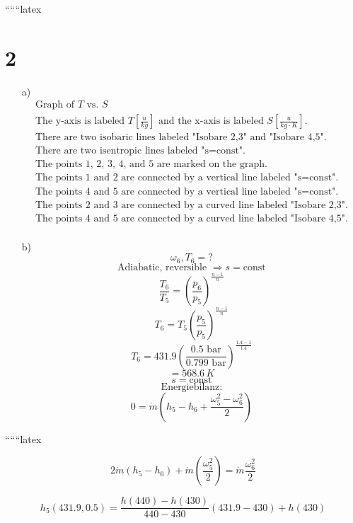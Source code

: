 
``````latex


\section*{2}
\begin{itemize}
    \item[a)] 
    \[
    \begin{array}{c}
    \text{Graph of } T \text{ vs. } S \\
    \text{The y-axis is labeled } T \left[ \frac{u}{kg} \right] \text{ and the x-axis is labeled } S \left[ \frac{u}{kg \cdot K} \right]. \\
    \text{There are two isobaric lines labeled "Isobare 2,3" and "Isobare 4,5".} \\
    \text{There are two isentropic lines labeled "s=const".} \\
    \text{The points 1, 2, 3, 4, and 5 are marked on the graph.} \\
    \text{The points 1 and 2 are connected by a vertical line labeled "s=const".} \\
    \text{The points 4 and 5 are connected by a vertical line labeled "s=const".} \\
    \text{The points 2 and 3 are connected by a curved line labeled "Isobare 2,3".} \\
    \text{The points 4 and 5 are connected by a curved line labeled "Isobare 4,5".} \\
    \end{array}
    \]

    \item[b)] 
    \[
    \omega_6, T_6 = ?
    \]
    \[
    \text{Adiabatic, reversible } \Rightarrow s = \text{const}
    \]
    \[
    \frac{T_6}{T_5} = \left( \frac{p_6}{p_5} \right)^{\frac{n-1}{n}}
    \]
    \[
    T_6 = T_5 \left( \frac{p_5}{p_5} \right)^{\frac{n-1}{n}}
    \]
    \[
    T_6 = 431.9 \left( \frac{0.5 \text{ bar}}{0.799 \text{ bar}} \right)^{\frac{1.4-1}{1.4}}
    \]
    \[
    = 568.6 \, K
    \]
    \[
    s = \text{const}
    \]
    \[
    \text{Energiebilanz:}
    \]
    \[
    0 = \dot{m} (h_5 - h_6 + \frac{\omega_5^2 - \omega_6^2}{2})
    \]
\end{itemize}

``````latex

\[
2 \dot{m} (h_5 - h_6) + \dot{m} \left( \frac{\omega_5^2}{2} \right) = \dot{m} \frac{\omega_6^2}{2}
\]

\[
h_5 (431.9, 0.5) = \frac{h(440) - h(430)}{440 - 430} (431.9 - 430) + h(430)
\]

